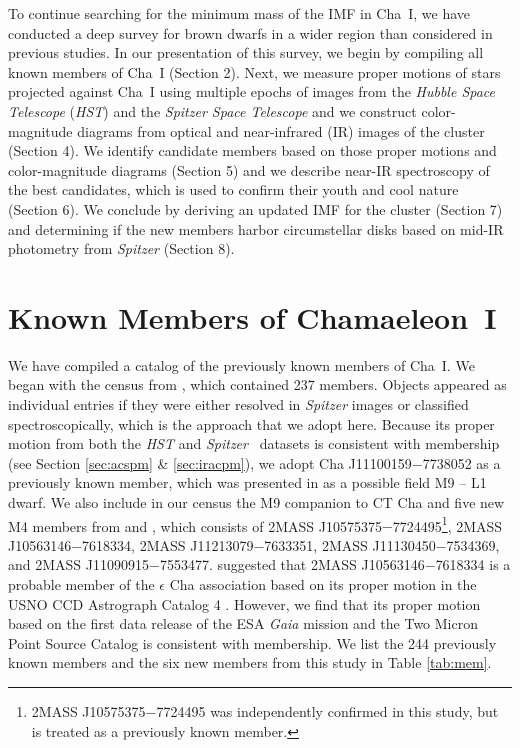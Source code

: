 \documentclass{emulateapj}
\def\spitz{{\it Spitzer }}
\begin{document}
To continue searching for the minimum mass of the IMF in Cha~I,
we have conducted a deep survey for brown dwarfs in a 
wider region than considered in previous studies. 
In our presentation of this survey, we begin
by compiling all known members of Cha~I (Section 2). 
Next, we measure proper motions of stars projected against Cha~I using 
multiple epochs of images from the {\it Hubble Space Telescope} ({\it HST})
and the {\it Spitzer Space Telescope} \citep[][Section 3]{wer04} and we
construct color-magnitude diagrams from optical and near-infrared (IR) images
of the cluster (Section 4). We identify candidate members based on those 
proper motions and color-magnitude diagrams (Section 5) and we describe 
near-IR spectroscopy of the best candidates,
which is used to confirm their youth and cool nature (Section 6).
We conclude by deriving an updated IMF for the cluster (Section 7)
and determining if the new members harbor circumstellar disks based on
mid-IR photometry from {\it Spitzer} (Section 8).

\section{Known Members of Chamaeleon~I}
\label{sec:cens}

We have compiled a catalog of the previously known members of Cha~I.
We began with the census from \cite{luhm08}, which contained 237 members.
Objects appeared as individual entries if they were 
either resolved in \spitz images or classified spectroscopically,
which is the approach that we adopt here.
Because its proper motion from both the {\it HST} and \spitz\ datasets is consistent with membership
(see Section \ref{sec:acspm} \& \ref{sec:iracpm}),
we adopt Cha J11100159$-$7738052 as a previously known member,
which was presented in \cite{luhm07}
as a possible field M9 -- L1 dwarf. 
We also include in our census the M9 companion to CT Cha \citep{sch08}
and five new M4 members from \cite{fra15} and \cite{sac17}, 
which consists of 2MASS J10575375$-$7724495\footnote{2MASS J10575375$-$7724495
was independently confirmed in this study, but is treated as a previously
known member.},
2MASS J10563146$-$7618334,
2MASS J11213079$-$7633351,
2MASS J11130450$-$7534369,
and 2MASS J11090915$-$7553477.
\cite{sac17} suggested that 2MASS J10563146$-$7618334 
is a probable member of the $\epsilon$ Cha association based on its proper
motion in the USNO CCD Astrograph Catalog 4 \citep[UCAC4;][]{zac13}. However, 
we find that its proper motion based on the first data release of the
ESA {\it Gaia} mission \citep{gaia16a,gaia16b}
and the Two Micron Point Source Catalog \citep[2MASS;][]{skr06} is
consistent with membership. 
We list the 244 previously known members and the six new members 
from this study in Table \ref{tab:mem}. 
\end{document}
